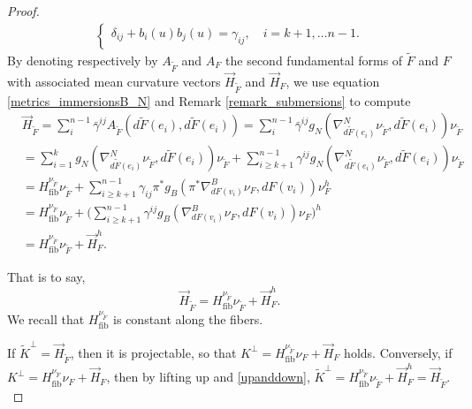 \documentclass[12pt]{article}
\numberwithin{lemma}{section}
\begin{document}
{\begin{proof}
\begin{eqnarray}
\begin{cases}
\delta_{ij}+b_i(u)b_j(u)=\gamma_{ij},\quad i=k+1,\dots n-1.
\end{cases}
\end{eqnarray}
By denoting respectively by $A_{\widetilde{F}}$ and $A_F$ the second fundamental forms of $\widetilde{F}$ and $F$ with associated mean curvature vectors $\vec{H}_{\widetilde{F}}$ and $\vec{H}_F$, we use equation \eqref{metrics_immersionsB_N} and Remark \ref{remark_submersions} to compute
\begin{align*}
& \vec{H}_{\widetilde{F}} = \sum_i^{n-1} \bar{\gamma}^{ij} A_{\widetilde{F}}(d\widetilde{F}(e_i),d\widetilde{F}(e_i))=
\sum_i ^{n-1}\bar{\gamma}^{ij}g_{N}(\nabla^{N}_{d\widetilde{F}(e_i)}\nu_{\widetilde{F}},d\widetilde{F}(e_i))\nu_{\widetilde{F}}\\&=\sum_{i=1} ^kg_{N}(\nabla^{N}_{d\widetilde{F}(e_i)}\nu_{\widetilde{F}},d\widetilde{F}(e_i))\nu_{\widetilde{F}}+
\sum_{i\geq k+1}^{n-1}\gamma^{ij} g_{N}(\nabla^{N}_{d\widetilde{F}(e_i)}\nu_{\widetilde{F}},d\widetilde{F}(e_i))\nu_{\widetilde{F}}\\& = H_{\mathrm{fib}}^{\nu_{\widetilde{F}}} \nu_{\widetilde{F}} +\sum_{i\geq k+1}^{n-1}\gamma_{ij} \pi^*g_{B}(\pi^*\nabla^{B}_{dF(v_i)}\nu_{F},dF(v_i))\nu_{F}^h\\
&=H_{\mathrm{fib}}^{\nu_{\widetilde{F}}} \nu_{\widetilde{F}}+\Big( \sum_{i\geq k+1}^{n-1}\gamma^{ij} g_{B}(\nabla^{B}_{dF(v_i)}\nu_{F},dF(v_i))\nu_{F}\Big)^{h}\\& =H_{\mathrm{fib}}^{\nu_{\widetilde{F}}} \nu_{\widetilde{F}}+\vec{H}_{F}^{h}.
\end{align*}

That is to say,
\begin{equation}\label{upanddown}
\vec{H}_{\widetilde{F}} =H_{\mathrm{fib}}^{\nu_{\widetilde{F}}} \nu_{\widetilde{F}}+\vec{H}_{F}^{h}.
\end{equation}
We recall that $H_{\mathrm{fib}}^{\nu_{\widetilde{F}}}$ is constant along the fibers. 

If $\tilde{K}^{\perp}=\vec{H}_{\widetilde{F}}$, then it is projectable, so that $K^{\perp}= H_{\mathrm{fib}}^{\nu_{\widetilde{F}}} \nu_{F}+\vec{H}_{F}$ holds. Conversely, if $K^{\perp}= H_{\mathrm{fib}}^{\nu_{\widetilde{F}}} \nu_{F}+\vec{H}_{F}$, then by lifting up and \eqref{upanddown}, $\tilde{K}^{\perp}=H_{\mathrm{fib}}^{\nu_{\widetilde{F}}} \nu_{\widetilde{F}}+\vec{H}_{F}^{h}=\vec{H}_{\widetilde{F}}$.\\


\end{proof}}
\end{document}
